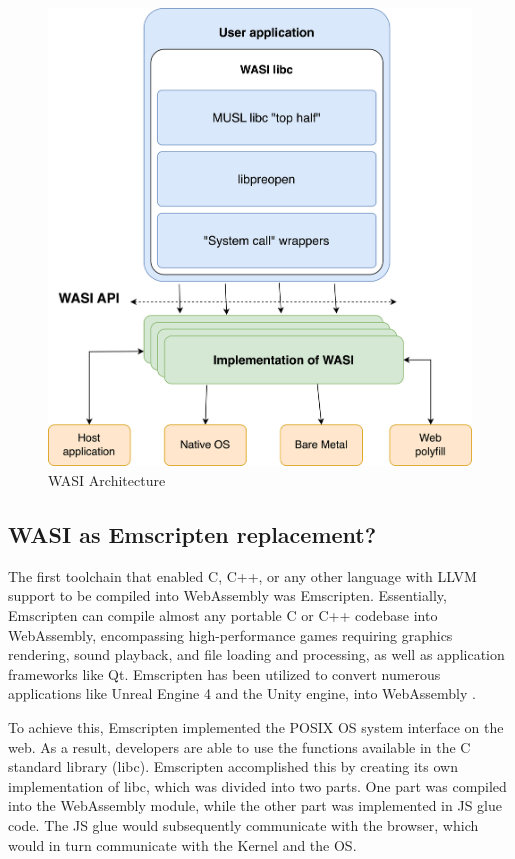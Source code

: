 \begin{figure}[H]
	\centering
		\includegraphics[width=130mm,scale=0.8]{images/wasm/WASI_Architecture.png}
	\caption{WASI Architecture}
	\label{fig:wasi-architecture}
\end{figure}

\subsection{WASI as Emscripten replacement?}
The first toolchain that enabled C, C++, or any other language with \gls{LLVM} support to be compiled into WebAssembly was Emscripten. Essentially, Emscripten can compile almost any portable C or C++ codebase into WebAssembly, encompassing high-performance games requiring graphics rendering, sound playback, and file loading and processing, as well as application frameworks like Qt. Emscripten has been utilized to convert numerous applications like Unreal Engine 4 and the Unity engine, into WebAssembly \cite{emscriptencommunity_2023_emscripten}. 

To achieve this, Emscripten implemented the \gls{POSIX} OS system interface on the web. 
As a result, developers are able to use the functions available in the C standard library (\gls{libc}). 
Emscripten accomplished this by creating its own implementation of libc, which was divided into two parts. One part was compiled into the WebAssembly module, while the other part was implemented in \gls{JS glue code}. 
The JS glue would subsequently communicate with the browser, which would in turn communicate with the Kernel and the OS.

